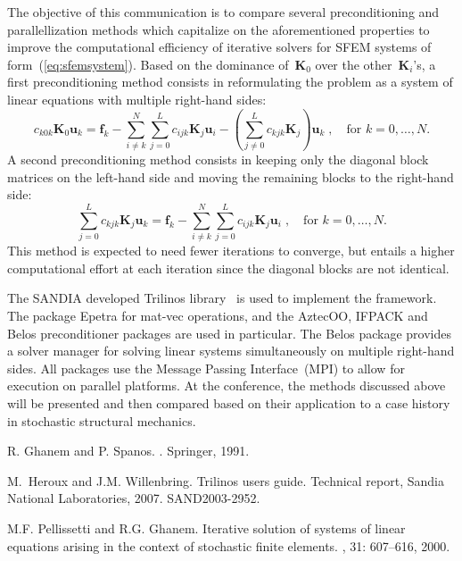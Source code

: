 \documentclass{report}
\begin{document}
The objective of this communication is to compare several preconditioning
and parallellization methods which capitalize on the aforementioned
properties to improve the computational efficiency of iterative solvers
for SFEM systems of form~(\ref{eq:sfemsystem}). Based on the dominance
of~$\boldsymbol{K}_0$ over the other~$\boldsymbol{K}_i$'s, a first
preconditioning method consists in reformulating the problem as a system
of linear equations with multiple right-hand sides:
\begin{equation}
c_{k0k}\boldsymbol{K}_{0}\boldsymbol{u}_{k}=\boldsymbol{f}_{k}-\sum_{i\not=k}^{N}\sum_{j=0}^{L}c_{ijk}\boldsymbol{K}_{j}\boldsymbol{u}_{i}-\left(\sum_{j\not=0}^{L}c_{kjk}\boldsymbol{K}_{j}\right)\boldsymbol{u}_{k}\;,\quad\text{for~$k
= 0,\ldots,N$}.
\end{equation}
A second preconditioning method consists in keeping only the diagonal
block matrices on the left-hand side and moving the remaining blocks to
the right-hand side:
\begin{equation}
\sum_{j=0}^{L}c_{kjk}\boldsymbol{K}_{j}\boldsymbol{u}_{k}=\boldsymbol{f}_{k}-\sum_{i\not=k}^{N}\sum_{j=0}^{L}c_{ijk}\boldsymbol{K}_{j}\boldsymbol{u}_{i}\;,\quad\text{for~$k
= 0,\ldots,N$}.
\end{equation}
This method is expected to need fewer iterations to converge, but entails
a higher computational effort at each iteration since the diagonal blocks
are not identical.

The SANDIA developed Trilinos library~\cite{heroux2007} is used to
implement the framework. The package Epetra for mat-vec operations, and
the AztecOO, IFPACK and Belos preconditioner packages are used in
particular. The Belos package provides a solver manager for solving
linear systems simultaneously on multiple right-hand sides. All packages
use the Message Passing Interface~(MPI) to allow for execution on
parallel platforms. At the conference, the methods discussed above will
be presented and then compared based on their application to a case
history in stochastic structural mechanics.

\begin{thebibliography}{99}
{R}. {G}hanem and {P}. {S}panos.
.
\newblock Springer, 1991.

M.~Heroux and J.M. Willenbring.
\newblock Trilinos users guide.
\newblock Technical report, Sandia National Laboratories, 2007.
\newblock SAND2003-2952.

M.F. Pellissetti and R.G. Ghanem.
\newblock Iterative solution of systems of linear equations arising in the
context of stochastic finite elements.
, 31: 607--616, 2000.
\end{thebibliography}
\end{document}
